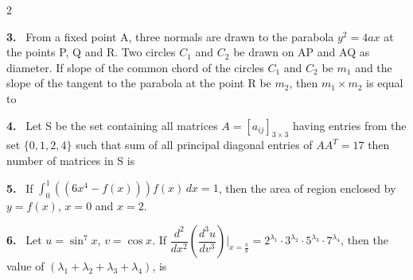 \documentclass[10pt]{extarticle}
\newcommand{\qn}[1]{\par\smallskip\noindent\textbf{#1.}~}
\begin{document}
\begin{multicols}{2}
\qn{3} From a fixed point A, three normals are drawn to the parabola $y^2=4ax$ at the points P, Q and R. Two circles $C_1$ and $C_2$ be drawn on AP and AQ as diameter. If slope of the common chord of the circles $C_1$ and $C_2$ be $m_1$ and the slope of the tangent to the parabola at the point R be $m_2$, then $m_1\times m_2$ is equal to
\qn{4} Let S be the set containing all matrices $A=[a_{ij}]_{3\times3}$ having entries from the set $\{0,1,2,4\}$ such that sum of all principal diagonal entries of $AA^T=17$ then number of matrices in S is
\qn{5} If $\displaystyle\int_0^1\left((6x^4-f(x))\right)f(x)\,dx=1$, then the area of region enclosed by $y=f(x)$, $x=0$ and $x=2$.
\qn{6} Let $u=\sin^7x$, $v=\cos x$. If $\dfrac{d^2}{dx^2}\left(\dfrac{d^3u}{dv^3}\right)\Bigg|_{x=\frac\pi8}=2^{\lambda_1}\cdot3^{\lambda_2}\cdot5^{\lambda_3}\cdot7^{\lambda_4}$, then the value of $(\lambda_1+\lambda_2+\lambda_3+\lambda_4)$, is
\end{multicols}
\end{document}
